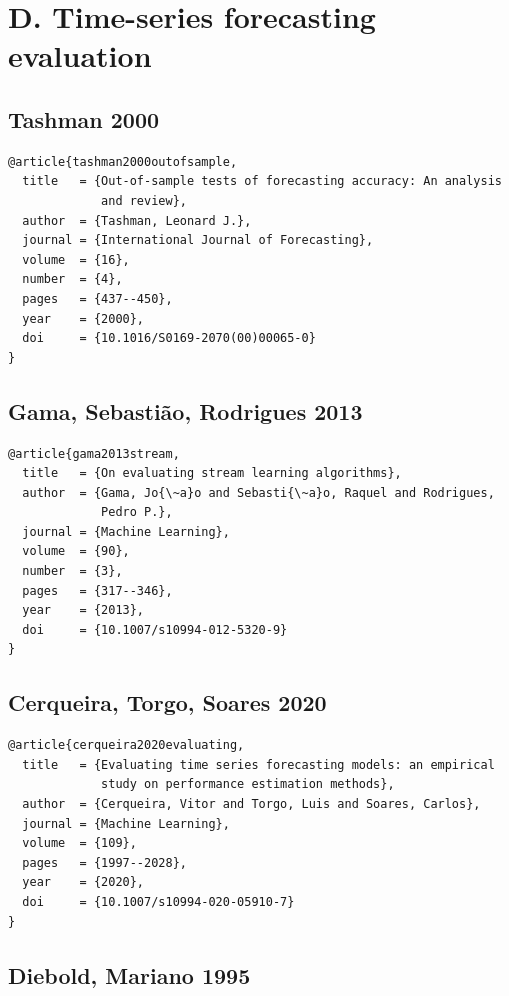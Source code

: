 \documentclass[11pt,a4paper,openany]{report}
\begin{document}
\section{D. Time-series forecasting evaluation}

\subsection{Tashman 2000}

\begin{verbatim}
@article{tashman2000outofsample,
  title   = {Out-of-sample tests of forecasting accuracy: An analysis
             and review},
  author  = {Tashman, Leonard J.},
  journal = {International Journal of Forecasting},
  volume  = {16},
  number  = {4},
  pages   = {437--450},
  year    = {2000},
  doi     = {10.1016/S0169-2070(00)00065-0}
}
\end{verbatim}

\subsection{Gama, Sebastião, Rodrigues 2013}

\begin{verbatim}
@article{gama2013stream,
  title   = {On evaluating stream learning algorithms},
  author  = {Gama, Jo{\~a}o and Sebasti{\~a}o, Raquel and Rodrigues,
             Pedro P.},
  journal = {Machine Learning},
  volume  = {90},
  number  = {3},
  pages   = {317--346},
  year    = {2013},
  doi     = {10.1007/s10994-012-5320-9}
}
\end{verbatim}

\subsection{Cerqueira, Torgo, Soares 2020}

\begin{verbatim}
@article{cerqueira2020evaluating,
  title   = {Evaluating time series forecasting models: an empirical
             study on performance estimation methods},
  author  = {Cerqueira, Vitor and Torgo, Luis and Soares, Carlos},
  journal = {Machine Learning},
  volume  = {109},
  pages   = {1997--2028},
  year    = {2020},
  doi     = {10.1007/s10994-020-05910-7}
}
\end{verbatim}

\subsection{Diebold, Mariano 1995}
\end{document}
